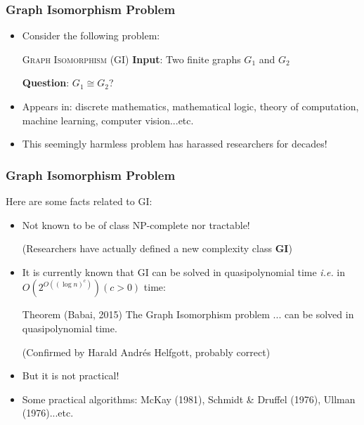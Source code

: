 \documentclass{beamer}
\begin{document}
\begin{frame}
\frametitle{Graph Isomorphism Problem}

\begin{itemize}
	\item Consider the following problem: \pause
	
\begin{block}{\textsc{Graph Isomorphism (GI)}}
{\bf Input}:  Two finite graphs $G_1$ and $G_2$

{\bf Question}: $G_1 \cong G_2$?

\end{block} \pause

	\item Appears in: discrete mathematics, mathematical logic, theory of computation, machine learning, computer vision...etc. \pause
	
	\item This seemingly harmless problem has harassed researchers for decades!
\end{itemize}

\end{frame}

\begin{frame}
\frametitle{Graph Isomorphism Problem}

Here are some facts related to \textsc{GI}:

\begin{itemize}
	\item Not known to be of class NP-complete nor tractable!
	
	(Researchers have actually defined a new complexity class {\bf GI}) \pause
	
	\item It is currently known that \textsc{GI} can be solved in quasipolynomial time {\it i.e.} in $O \left( 2^{O \left( \left( \log n \right)^c \right)} \right) (c > 0)$ time: \pause
	
\begin{block}{Theorem (Babai, 2015)}
The Graph Isomorphism problem ... can be solved in quasipolynomial time.
	\end{block}
(Confirmed by Harald Andr\'es Helfgott, probably correct)	
	 \pause

	\item But it is not practical! \pause
	
	\item Some practical algorithms: McKay (1981), Schmidt \& Druffel (1976), Ullman (1976)...etc.
\end{itemize}

\end{frame}
\end{document}

